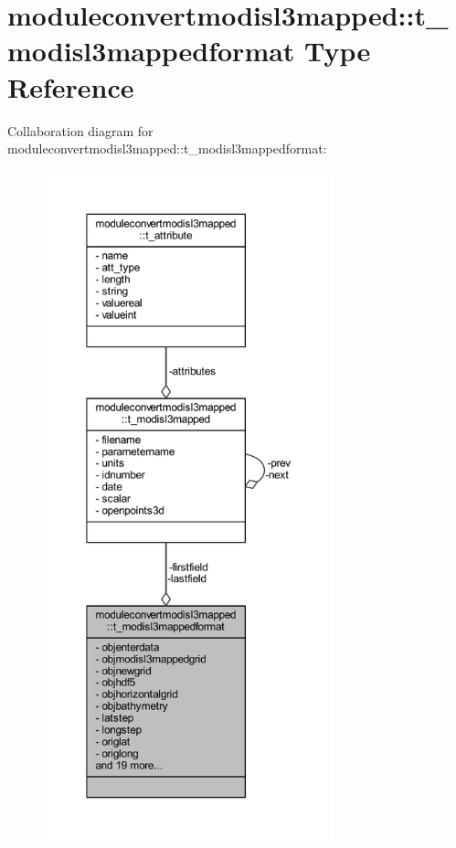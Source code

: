 \hypertarget{structmoduleconvertmodisl3mapped_1_1t__modisl3mappedformat}{}\section{moduleconvertmodisl3mapped\+:\+:t\+\_\+modisl3mappedformat Type Reference}
\label{structmoduleconvertmodisl3mapped_1_1t__modisl3mappedformat}


Collaboration diagram for moduleconvertmodisl3mapped\+:\+:t\+\_\+modisl3mappedformat\+:\nopagebreak
\begin{figure}[H]
\begin{center}
\leavevmode
\includegraphics[height=550pt]{structmoduleconvertmodisl3mapped_1_1t__modisl3mappedformat__coll__graph}
\end{center}
\end{figure}
